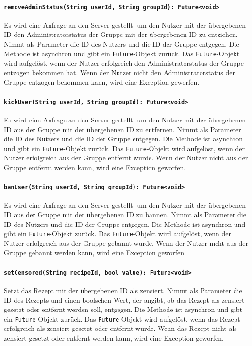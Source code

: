 \documentclass[parskip=full]{scrartcl}
\begin{document}
\paragraph{\texttt{removeAdminStatus(String userId, String groupId): Future<void>}}
Es wird eine Anfrage an den Server gestellt, um den Nutzer mit der übergebenen ID den Administratorstatus der Gruppe mit der übergebenen ID zu entziehen. Nimmt als Parameter die ID des Nutzers und die ID der Gruppe entgegen. Die Methode ist asynchron und gibt ein \texttt{Future}-Objekt zurück. Das \texttt{Future}-Objekt wird aufgelöst, wenn der Nutzer erfolgreich den Administratorstatus der Gruppe entzogen bekommen hat. Wenn der Nutzer nicht den Administratorstatus der Gruppe entzogen bekommen kann, wird eine Exception geworfen.
\paragraph{\texttt{kickUser(String userId, String groupId): Future<void>}}
Es wird eine Anfrage an den Server gestellt, um den Nutzer mit der übergebenen ID aus der Gruppe mit der übergebenen ID zu entfernen. Nimmt als Parameter die ID des Nutzers und die ID der Gruppe entgegen. Die Methode ist asynchron und gibt ein \texttt{Future}-Objekt zurück. Das \texttt{Future}-Objekt wird aufgelöst, wenn der Nutzer erfolgreich aus der Gruppe entfernt wurde. Wenn der Nutzer nicht aus der Gruppe entfernt werden kann, wird eine Exception geworfen.
\paragraph{\texttt{banUser(String userId, String groupId): Future<void>}}
Es wird eine Anfrage an den Server gestellt, um den Nutzer mit der übergebenen ID aus der Gruppe mit der übergebenen ID zu bannen. Nimmt als Parameter die ID des Nutzers und die ID der Gruppe entgegen. Die Methode ist asynchron und gibt ein \texttt{Future}-Objekt zurück. Das \texttt{Future}-Objekt wird aufgelöst, wenn der Nutzer erfolgreich aus der Gruppe gebannt wurde. Wenn der Nutzer nicht aus der Gruppe gebannt werden kann, wird eine Exception geworfen.
\paragraph{\texttt{setCensored(String recipeId, bool value): Future<void>}}
Setzt das Rezept mit der übergebenen ID als zensiert. Nimmt als Parameter die ID des Rezepts und einen boolschen Wert, der angibt, ob das Rezept als zensiert gesetzt oder entfernt werden soll, entgegen. Die Methode ist asynchron und gibt ein \texttt{Future}-Objekt zurück. Das \texttt{Future}-Objekt wird aufgelöst, wenn das Rezept erfolgreich als zensiert gesetzt oder entfernt wurde. Wenn das Rezept nicht als zensiert gesetzt oder entfernt werden kann, wird eine Exception geworfen.
\newpage
\end{document}
